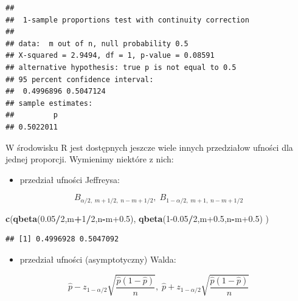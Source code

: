 \documentclass[polish,]{book}
\newenvironment{Shaded}{\begin{snugshade}}{\end{snugshade}}
\newcommand{\DecValTok}[1]{\textcolor[rgb]{0.00,0.00,0.81}{#1}}
\newcommand{\FloatTok}[1]{\textcolor[rgb]{0.00,0.00,0.81}{#1}}
\newcommand{\KeywordTok}[1]{\textcolor[rgb]{0.13,0.29,0.53}{\textbf{#1}}}
\newcommand{\NormalTok}[1]{#1}
\newcommand{\OperatorTok}[1]{\textcolor[rgb]{0.81,0.36,0.00}{\textbf{#1}}}
\providecommand{\tightlist}{%
  \setlength{\itemsep}{0pt}\setlength{\parskip}{0pt}}
\begin{document}
\begin{verbatim}
## 
##  1-sample proportions test with continuity correction
## 
## data:  m out of n, null probability 0.5
## X-squared = 2.9494, df = 1, p-value = 0.08591
## alternative hypothesis: true p is not equal to 0.5
## 95 percent confidence interval:
##  0.4996896 0.5047124
## sample estimates:
##         p 
## 0.5022011
\end{verbatim}

W środowisku R jest dostępnych jeszcze wiele innych przedziałow ufności dla
jednej proporcji. Wymienimy niektóre z nich:

\begin{itemize}
\tightlist
\item
  przedział ufności Jeffreysa:
\end{itemize}

\begin{equation}
B_{\alpha/2,\;m+1/2,\;n-m+1/2},\;B_{1-\alpha/2,\;m+1,\;n-m+1/2}
\label{eq:wz1159}
\end{equation}

\begin{Shaded}
\begin{Highlighting}[]
\KeywordTok{c}\NormalTok{(}\KeywordTok{qbeta}\NormalTok{(}\FloatTok{0.05}\OperatorTok{/}\DecValTok{2}\NormalTok{,m}\OperatorTok{+}\DecValTok{1}\OperatorTok{/}\DecValTok{2}\NormalTok{,n}\OperatorTok{-}\NormalTok{m}\FloatTok{+0.5}\NormalTok{), }\KeywordTok{qbeta}\NormalTok{(}\DecValTok{1}\FloatTok{-0.05}\OperatorTok{/}\DecValTok{2}\NormalTok{,m}\FloatTok{+0.5}\NormalTok{,n}\OperatorTok{-}\NormalTok{m}\FloatTok{+0.5}\NormalTok{) )}
\end{Highlighting}
\end{Shaded}

\begin{verbatim}
## [1] 0.4996928 0.5047092
\end{verbatim}

\begin{itemize}
\tightlist
\item
  przedział ufności (asymptotyczny) Walda:
\end{itemize}

\begin{equation}
\hat{p}-z_{1-\alpha/2}\sqrt{\frac{\hat{p}(1-\hat{p})}{n}},\;\hat{p}+z_{1-\alpha/2}\sqrt{\frac{\hat{p}(1-\hat{p})}{n}}
\label{eq:wz1160}
\end{equation}
\end{document}
